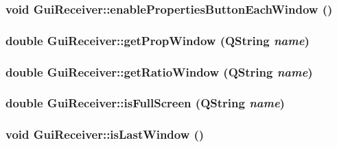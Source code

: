 \hypertarget{classGuiReceiver_ad4c4385d49e830263e996416e16d137a}{
\subsubsection[{enablePropertiesButtonEachWindow}]{\setlength{\rightskip}{0pt plus 5cm}void GuiReceiver::enablePropertiesButtonEachWindow ()}}
\label{classGuiReceiver_ad4c4385d49e830263e996416e16d137a}
\hypertarget{classGuiReceiver_aff1aa23d540c06006c295ce69c8bb771}{
\subsubsection[{getPropWindow}]{\setlength{\rightskip}{0pt plus 5cm}double GuiReceiver::getPropWindow (QString {\em name})}}
\label{classGuiReceiver_aff1aa23d540c06006c295ce69c8bb771}
\hypertarget{classGuiReceiver_aaf16c278a39a4ee6a02de8de5e348c5c}{
\subsubsection[{getRatioWindow}]{\setlength{\rightskip}{0pt plus 5cm}double GuiReceiver::getRatioWindow (QString {\em name})}}
\label{classGuiReceiver_aaf16c278a39a4ee6a02de8de5e348c5c}
\hypertarget{classGuiReceiver_a6dd924ef78d8e7ec9e008f9007dbd032}{
\subsubsection[{isFullScreen}]{\setlength{\rightskip}{0pt plus 5cm}double GuiReceiver::isFullScreen (QString {\em name})}}
\label{classGuiReceiver_a6dd924ef78d8e7ec9e008f9007dbd032}
\hypertarget{classGuiReceiver_a9f788023836b17e8aed97b3770386ea9}{
\subsubsection[{isLastWindow}]{\setlength{\rightskip}{0pt plus 5cm}void GuiReceiver::isLastWindow ()}}

